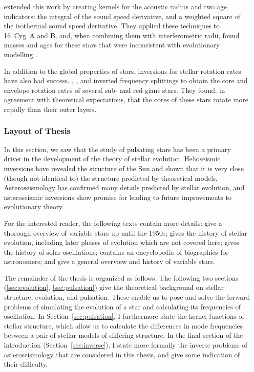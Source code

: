 \citet{2015A&A...583A..62B, 2015A&A...574A..42B} extended this work by creating kernels for the acoustic radius and two age indicators: the integral of the sound speed derivative, and a weighted square of the isothermal sound speed derivative. 
They applied these techniques to 16~Cyg~A and B, and, when combining them with interferometric radii, found masses and ages for these stars that were inconsistent with evolutionary modelling \citep{2016A&A...585A.109B, 2016A&A...596A..73B}. 

In addition to the global properties of stars, inversions for stellar rotation rates have also had success. 
\citet{2012ApJ...756...19D, 2014A&A...564A..27D}, \citet{2016ApJ...817...65D}, and \citet{2017A&A...602A..62T} inverted frequency splittings to obtain the core and envelope rotation rates of several sub- and red-giant stars. 
They found, in agreement with theoretical expectations, that the cores of these stars rotate more rapidly than their outer layers. 

\newpage
\subsubsection*{Layout of Thesis}
In this section, we saw that the study of pulsating stars has been a primary driver in the development of the theory of stellar evolution. 
Helioseismic inversions have revealed the structure of the Sun and shown that it is very close (though not identical to) the structure predicted by theoretical models. 
Asteroseismology has confirmed many details predicted by stellar evolution, and asteroseismic inversions show promise for leading to future improvements to evolutionary theory. 

For the interested reader, the following texts contain more details: 
\citet{1958HDP....51..353L} give a thorough overview of variable stars up until the 1950s; 
\citet{ARNY1990211} gives the history of stellar evolution, including later phases of evolution which are not covered here; 
\citet{2016lrsp...13....2b} gives the history of solar oscillations;
\citet{bolt2007biographical} contains an encyclopedia of biographies for astronomers;
and \citet{2015pust.book.....C} give a general overview and history of variable stars.

The remainder of the thesis is organized as follows. 
The following two sections (\ref{sec:evolution}, \ref{sec:pulsation}) give the theoretical background on stellar structure, evolution, and pulsation. 
These enable us to pose and solve the forward problems of simulating the evolution of a star and calculating its frequencies of oscillation. 
In Section~\ref{sec:pulsation}, I furthermore state the kernel functions of stellar structure, which allow us to calculate the differences in mode frequencies between a pair of stellar models of differing structure. 
In the final section of the introduction (Section~\ref{sec:inverse}), I state more formally the inverse problems of asteroseismology that are considered in this thesis, and give some indication of their difficulty. 

